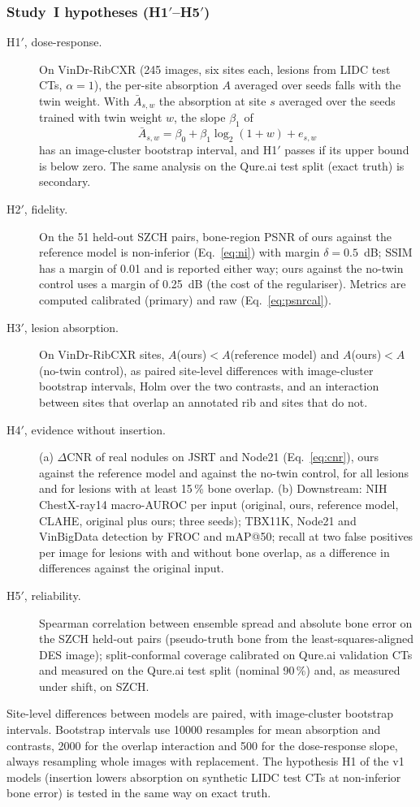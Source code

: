 \subsubsection{Study~I hypotheses (H1$'$--H5$'$)}
\begin{description}
\item[H1$'$, dose-response.] On VinDr-RibCXR (245 images, six sites each, lesions from LIDC test CTs, $\alpha=1$), the per-site absorption
 $A$ averaged over seeds falls with the twin weight. With $\bar A_{s,w}$ the absorption at site $s$ averaged over the seeds trained with
 twin weight $w$, the slope $\beta_1$ of
 \begin{equation}
 \bar A_{s,w}=\beta_0+\beta_1\log_2(1+w)+e_{s,w}
 \label{eq:dose}
 \end{equation}
 has an image-cluster bootstrap interval, and H1$'$ passes if its upper bound is below zero. The same analysis on the Qure.ai test split
 (exact truth) is secondary.
\item[H2$'$, fidelity.] On the 51 held-out SZCH pairs, bone-region PSNR of ours against the reference model is non-inferior
 (Eq.~\eqref{eq:ni}) with margin $\delta=0.5$~dB; SSIM has a margin of 0.01 and is reported either way; ours against the no-twin control
 uses a margin of 0.25~dB (the cost of the regulariser). Metrics are computed calibrated (primary) and raw (Eq.~\eqref{eq:psnrcal}).
\item[H3$'$, lesion absorption.] On VinDr-RibCXR sites, $A$(ours)$<A$(reference model) and $A$(ours)$<A$(no-twin control), as paired
 site-level differences with image-cluster bootstrap intervals, Holm over the two contrasts, and an interaction between sites that overlap
 an annotated rib and sites that do not.
\item[H4$'$, evidence without insertion.] (a) $\Delta$CNR of real nodules on JSRT and Node21 (Eq.~\eqref{eq:cnr}), ours against the
 reference model and against the no-twin control, for all lesions and for lesions with at least 15\,\% bone overlap. (b) Downstream: NIH
 ChestX-ray14 macro-AUROC per input (original, ours, reference model, CLAHE, original plus ours; three seeds); TBX11K, Node21 and
 VinBigData detection by FROC and mAP@50; recall at two false positives per image for lesions with and without bone overlap, as a
 difference in differences against the original input.
\item[H5$'$, reliability.] Spearman correlation between ensemble spread and absolute bone error on the SZCH held-out pairs (pseudo-truth
 bone from the least-squares-aligned DES image); split-conformal coverage calibrated on Qure.ai validation CTs and measured on the Qure.ai
 test split (nominal 90\,\%) and, as measured under shift, on SZCH.
\end{description}
Site-level differences between models are paired, with image-cluster bootstrap intervals. Bootstrap intervals use \num{10000} resamples for
mean absorption and contrasts, \num{2000} for the overlap interaction and 500 for the dose-response slope, always resampling whole images
with replacement. The hypothesis H1 of the v1 models (insertion lowers absorption on synthetic LIDC test CTs at non-inferior bone error) is
tested in the same way on exact truth.

